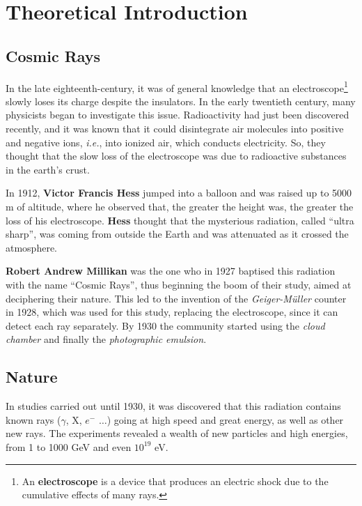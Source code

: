 	\chapter{Theoretical Introduction}

	\section{Cosmic Rays}

	In the late eighteenth-century, it was of general knowledge that an electroscope\footnote{An \textbf{electroscope} is a device that produces an electric shock due to the cumulative effects of many rays.} slowly loses its charge despite the insulators. In the early twentieth century, many physicists began to investigate this issue. Radioactivity had just been discovered recently, and it was known that it could disintegrate air molecules into positive and negative ions, \textit{i.e.}, into ionized air, which conducts electricity. So, they thought that the slow loss of the electroscope was due to radioactive substances in the earth's crust.

In 1912, \textbf{Victor Francis Hess} jumped into a balloon and was raised up to 5000 m of altitude, where he observed that, the greater the height was, the greater the loss of his electroscope. \textbf{Hess} thought that the mysterious radiation, called \enquote{ultra sharp}, was coming from outside the Earth and was attenuated as it crossed the atmosphere.

\textbf{Robert Andrew Millikan} was the one who in 1927 baptised this radiation with the name \enquote{Cosmic Rays}, thus beginning the boom of their study, aimed at deciphering their nature. This led to the invention of the \textit{Geiger-M{\"u}ller} counter in 1928, which was used for this study, replacing the electroscope, since it can detect each ray  separately. By 1930 the community started using the \textit{cloud chamber} and finally the \textit{photographic emulsion}.



	\section{Nature}

	In studies carried out until 1930, it was discovered that this radiation contains known rays ($\gamma$, X, $e^-$ $\dots$) going at high speed and great energy, as well as other new rays. The experiments revealed a wealth of new particles and high energies, from 1 to 1000 GeV and even $10^{19}$ eV. 

